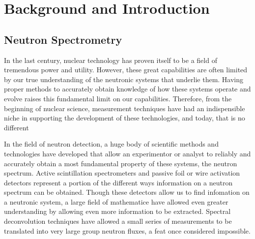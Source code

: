 
\cleardoublepage


\chapter{Background and Introduction}



\section{Neutron Spectrometry}
In the last century, nuclear technology has proven itself to be a field of tremendous power and utility.
However, these great capabilities are often limited by our true understanding of the neutronic systems that underlie them.
Having proper methods to accurately obtain knowledge of how these systems operate and evolve raises this fundamental limit on our capabilities.
Therefore, from the beginning of nuclear science, measurement techniques have had an indispensible niche in supporting the development of these technologies, and today, that is no different


In the field of neutron detection, a huge body of scientific methods and technologies have developed that allow an experimentor or analyst to reliably and accurately obtain a most fundamental property of these systems, the neutron spectrum.
Active scintillation spectrometers and passive foil or wire activation detectors represent a portion of the different ways information on a neutron spectrum can be obtained.
Though these detectors allow us to find infomation on a neutronic system, a large field of mathematice have allowed even greater understanding by allowing even more information to be extracted.
Spectral deconvolution techniques have allowed a small series of measurements to be translated into very large group neutron fluxes, a feat once considered impossible.

